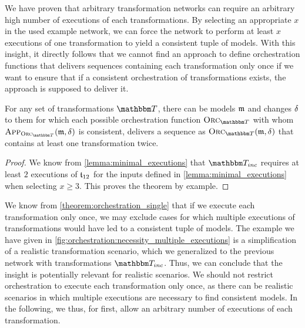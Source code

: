 We have proven that arbitrary transformation networks can require an arbitrary high number of executions of each transformations.
By selecting an appropriate $x$ in the used example network, we can force the network to perform at least $x$ executions of one transformation to yield a consistent tuple of models.
With this insight, it directly follows that we cannot find an approach to define orchestration functions that delivers sequences containing each transformation only once if we want to ensure that if a consistent orchestration of transformations exists, the approach is supposed to deliver it.

\begin{theorem}
    \label{theorem:orchestration_single}
    For any set of transformations $\transformationset{T}$, there can be models $\mathfrak{m}$ and changes $\mathfrak{\delta}_{}$ to them for which each possible orchestration function $\orcfunction{\transformationset{T}}$ with whom $\appfunction{\orcfunction{\transformationset{T}}}(\modeltuple{m}, \changetuple{})$ is consistent, delivers a sequence as $\orcfunction{\transformationset{T}}(\modeltuple{m}, \changetuple{})$ that contains at least one transformation twice.
\end{theorem}
\begin{proof}
    We know from \autoref{lemma:minimal_executions} that $\transformationset{T}_{inc}$ requires at least $2$ executions of $\mathfrak{t}_{12}$ for the inputs defined in \autoref{lemma:minimal_executions} when selecting $x \geq 3$.
    This proves the theorem by example.
\end{proof}

We know from \autoref{theorem:orchestration_single} that if we execute each transformation only once, we may exclude cases for which multiple executions of transformations would have led to a consistent tuple of models.
The example we have given in \autoref{fig:orchestration:necessity_multiple_executions} is a simplification of a realistic transformation scenario, which we generalized to the previous network with transformations $\transformationset{T}_{inc}$.
Thus, we can conclude that the insight is potentially relevant for realistic scenarios.
We should not restrict orchestration to execute each transformation only once, as there can be realistic scenarios in which multiple executions are necessary to find consistent models.
In the following, we thus, for first, allow an arbitrary number of executions of each transformation.

